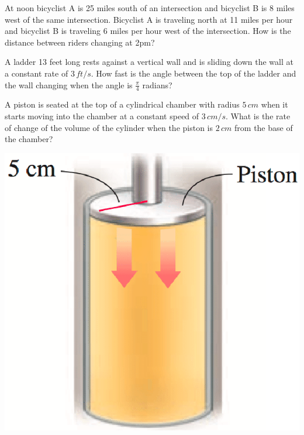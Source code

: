 \documentclass[mathNotesPreamble]{subfiles}
\begin{document}
\begin{ex*}
  At noon bicyclist A is 25 miles south of an intersection and bicyclist B is 8 miles west of the same intersection. Bicyclist A is traveling north at 11 miles per hour and bicyclist B is traveling 6 miles per hour west of the intersection. How is the distance between riders changing at 2pm?
\end{ex*}
\pagebreak

\begin{ex*}
  A ladder 13 feet long rests against a vertical wall and is sliding down the wall at a constant rate of $3\,ft/s$. How fast is the angle between the top of the ladder and the wall changing when the angle is $\frac{\pi}{4}$ radians?
\end{ex*}
\pagebreak

\noindent
\begin{minipage}[t]{0.7\linewidth}\mbox{}
  \begin{ex*}
    A piston is seated at the top of a cylindrical chamber with radius $5\,cm$ when it starts moving into the chamber at a constant speed of $3\,cm/s$. What is the rate of change of the volume of the cylinder when the piston is $2\,cm$ from the base of the chamber?
  \end{ex*}
\end{minipage}%
\begin{minipage}[t]{0.3\linewidth}\mbox{}
  \begin{flushright}
    \includegraphics[width=0.9\linewidth]{images/briggs_03_11/piston.png}
  \end{flushright}
\end{minipage}
\pagebreak
\end{document}
